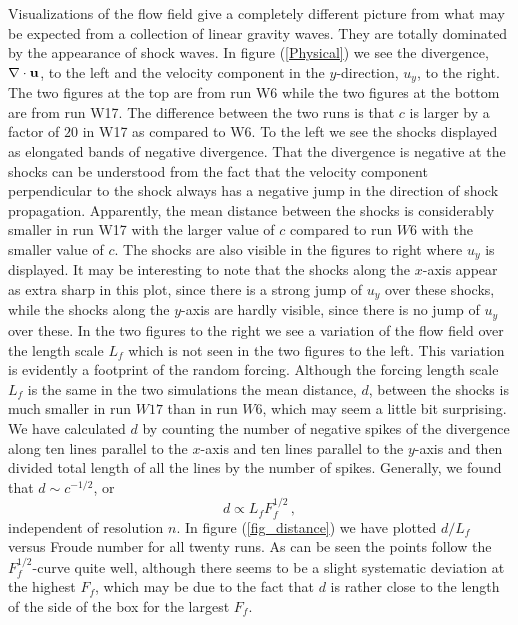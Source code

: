 Visualizations of the flow field give a completely different picture from what may be expected from a collection of linear gravity waves. They are totally dominated by the appearance of shock waves. In figure (\ref{Physical}) we see the divergence, $ \nabla \cdot {\bf u} $, to the left and the velocity component in the $ y $-direction, $ u_y $, to the right. The two figures at the top are from run W6 while the two figures at the bottom are from run W17. The difference between the two runs is that $ c $ is larger by a factor of $ 20 $ in W17 as compared to W6. To the left we see the shocks displayed as elongated bands of negative divergence. That the divergence is negative at the shocks can be understood from the fact that the velocity component perpendicular to the shock always has a negative jump in the direction of shock propagation. Apparently, the mean distance between the shocks is considerably smaller in run W17 with the larger value of $ c $ compared to run $ W6 $  with the smaller value of $ c $. The shocks are also visible in the figures to right where $ u_y $ is displayed. It may be interesting to note that the shocks along the $ x $-axis appear as extra sharp in this plot, since there is a strong jump  of $ u_{y} $ over these shocks, while the shocks along the $ y $-axis are hardly visible, since there is no jump of $ u_{y} $ over these.  In the two figures to the right we see a variation of the flow field over the length scale $ L_f $ which is not seen in the two figures to the left. This variation is evidently a footprint of the random forcing. 
Although the forcing length scale $ L_f $ is the same in the two simulations the mean distance, $ d $,  between the shocks is much smaller in run $ W17 $ than in run $ W6 $, which may seem a little bit surprising. We have calculated $ d $ by counting the number of negative spikes of the divergence along ten lines parallel to the $ x $-axis and ten lines parallel to the $ y $-axis and then divided  total length of all the lines by the number of spikes. Generally, we found that $ d \sim c^{-1/2} $, or
\begin{equation} \label{MeanDistance}
d \propto L_f F_f ^{1/2} \, ,
\end{equation} 
independent of resolution $ n $.
In figure (\ref{fig_distance}) we have plotted $ d/L_f $ versus Froude number for all twenty runs. As can be seen the points follow the $ F_f^{1/2} $-curve quite well, although there seems to be a slight systematic deviation at the highest $ F_f $, which may be due to the fact that $ d $ is rather close to the length of the side of the box for the largest $ F_f $. 

